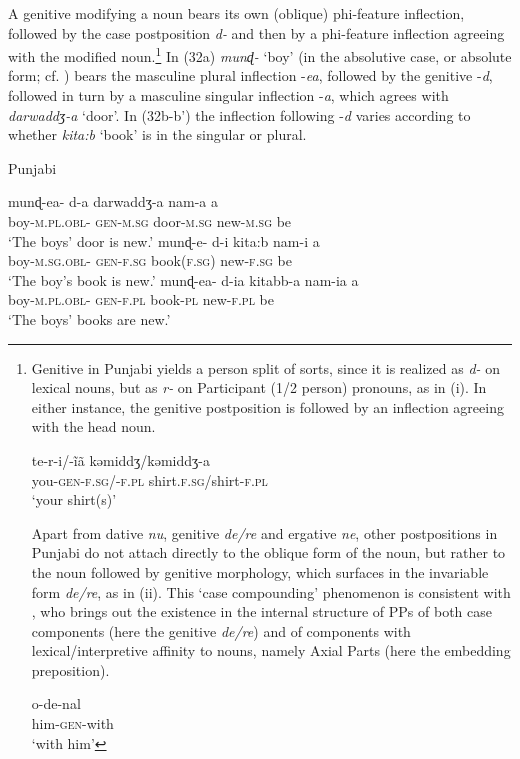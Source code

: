 \documentclass[output=paper]{langsci/langscibook}
\begin{document}
A genitive modifying a noun bears its own (oblique) phi-feature inflection, followed by the case postposition \textit{d-} and then by a phi-feature inflection agreeing with the modified noun.\footnote{Genitive in Punjabi yields a person split of sorts, since it is realized as \textit{d-} on lexical nouns, but as \textit{r-} on Participant (1\slash 2 person) pronouns, as in (i). In either instance, the genitive postposition is followed by an inflection agreeing with the head noun.

\ea \gll    te-r-i/-ĩã  kəmiddʒ/kəmiddʒ-a\\
            you-\textsc{gen-f.sg/-f.pl}
            shirt.\textsc{f.sg}/shirt-\textsc{f.pl}\\
    \glt    ‘your shirt(s)’
\z

Apart from dative \textit{nu}, genitive \textit{de\slash re} and ergative \textit{ne}, other postpositions in Punjabi do not attach directly to the oblique form of the noun, but rather to the noun followed by genitive morphology, which surfaces in the invariable form \textit{de\slash re}, as in (ii). This ‘case compounding’ phenomenon is consistent with \citet{Svenonius2006}, who brings out the existence in the internal structure of PPs of both case components (here the genitive \textit{de\slash re}) and of components with lexical\slash interpretive affinity to nouns, namely Axial Parts (here the embedding preposition).

\ea \gll    o-de-nal\\
            him-\textsc{gen}-with\\
    \glt    ‘with him’
\z
}
In (32a) \textit{munɖ-} ‘boy’ (in the absolutive case, or absolute form; cf. \citealt{Bailey1904}) bears the masculine plural inflection -\textit{ea}, followed by the genitive -\textit{d}, followed in turn by a masculine singular inflection -\textit{a}, which agrees with \textit{darwaddʒ-a} ‘door’. In (32b-b’) the inflection following -\textit{d} varies according to whether \textit{kita:b} ‘book’ is in the singular or plural. 

\ea%
    Punjabi\label{ex:manzini:32}\\
    \begin{xlista}
    \ex
    \gll munɖ-ea-    d-a     darwaddʒ-a   nam-a   a\\
         boy-\textsc{m.pl.obl-}  \textsc{gen-m.sg}  door-\textsc{m.sg}  new-\textsc{m.sg}    be\\
    \glt ‘The boys’ door is new.’
    \ex  
    \gll munɖ-e-    d-i     kita:b     nam-i     a\\
         boy-\textsc{m.sg.obl-}  \textsc{gen-f.sg}   book(\textsc{f.sg)}   new-\textsc{f.sg}   be\\
    \glt ‘The boy’s book is new.’
    \gll munɖ-ea-    d-ia     kitabb-a   nam-ia   a\\
         boy-\textsc{m.pl.obl-}  \textsc{gen-f.pl}   book-\textsc{pl}   new-\textsc{f.pl}   be\\
    \glt ‘The boys’ books are new.’ 
    \end{xlista}
    \z
\end{document}
